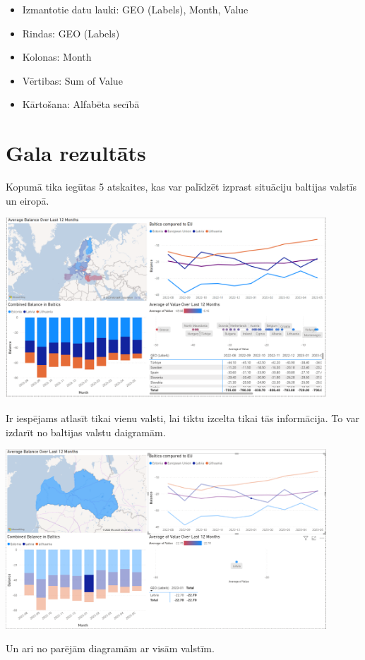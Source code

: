 \documentclass{article}
\begin{document}
\begin{itemize}
    \item Izmantotie datu lauki: GEO (Labels), Month, Value
    \item Rindas: GEO (Labels)
    \item Kolonas: Month
    \item Vērtibas: Sum of Value
    \item Kārtošana: Alfabēta secībā
\end{itemize}

\section{Gala rezultāts}

Kopumā tika iegūtas 5 atskaites, kas var palīdzēt izprast situāciju baltijas valstīs un eiropā.

\includegraphics[width=0.9\textwidth, center]{Overview}

Ir iespējams atlasīt tikai vienu valsti, lai tiktu izcelta tikai tās informācija. To var izdarīt no baltijas valstu daigramām.

\includegraphics[width=0.9\textwidth, center]{Latvia}

Un ari no parējām diagramām ar visām valstīm.
\end{document}
